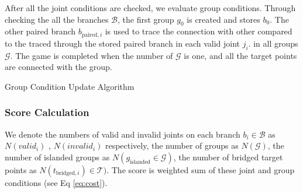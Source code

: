 After all the joint conditions are checked, we evaluate group conditions.
Through checking the all the branches $\mathcal{B}$, the first group $g_0$ is created and stores $b_0$.
The other paired branch $b_{\text{paired},i}$ is used to trace the connection with other  compared to the  traced through the stored paired branch  in each valid joint $j_i$.
 in all groups $\mathcal{G}$.
The game is completed when the number of $\mathcal{G}$ is one, and all the target points are connected with the group.

\begin{algorithm}
  \caption{Group Condition Update Algorithm}
  \begin{algorithmic}[1]
    \EndIf

            \EndIf
            \EndIf
          \EndIf
        \EndFor
      \EndFor

      \EndIf
    \EndFor

  \EndFunction
  \end{algorithmic}
  \label{al:connection}
\end{algorithm}

\subsubsection*{Score Calculation}
We denote the numbers of valid and invalid joints on each branch $b_i \in \mathcal{B}$ as $N(valid_i)$ , $N(invalid_i)$ respectively, the number of groups as $N(\mathcal{G} )$, the number of islanded groups as $N(g_{\text{islanded}} \in \mathcal{G} )$, the number of bridged target points as $N(t_{\text{bridged}, i}) \in \mathcal{T} )$.
The score is weighted sum of these joint and group conditions (see Eq \ref{eq:cost}).

